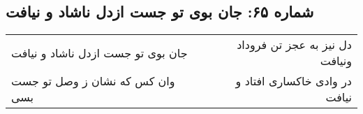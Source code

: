 \begin{center}
\section*{شماره ۶۵: جان بوی تو جست ازدل ناشاد و نیافت}
\label{sec:065}
\begin{longtable}{l p{0.5cm} r}
جان بوی تو جست ازدل ناشاد و نیافت
&&
دل نیز به عجز تن فروداد ونیافت
\\
وان کس که نشان ز وصل تو جست بسی
&&
در وادی خاکساری افتاد و نیافت
\\
\end{longtable}
\end{center}
